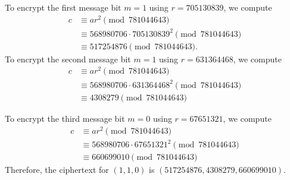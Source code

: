 \documentclass[
  coursecode={MTHE 418},
  assignmentname={Homework \homeworknumber},
  studentnumber=20053722,
  name={Bryan Hoang},
  draft,
]{
  ltxanswer%
}
\begin{document}
\begin{questions}
\begin{parts}
      \part{}
      \begin{solution}
        To encrypt the first message bit \(m = 1\) using \(r = 705130839\), we compute
        \begin{align*}
          c &\equiv ar^{2} \pmod{781044643}                        \\
            &\equiv 568980706 \cdot 705130839^{2} \pmod{781044643} \\
            &\equiv 517254876 \pmod{781044643}.
        \end{align*}
        To encrypt the second message bit \(m = 1\) using \(r = 631364468\), we compute
        \begin{align*}
          c &\equiv ar^{2} \pmod{781044643}                        \\
            &\equiv 568980706 \cdot 631364468^{2} \pmod{781044643} \\
            &\equiv 4308279 \pmod{781044643}
        \end{align*}

        To encrypt the third message bit \(m = 0\) using \(r = 67651321\), we compute
        \begin{align*}
          c &\equiv ar^{2} \pmod{781044643}                       \\
            &\equiv 568980706 \cdot 67651321^{2} \pmod{781044643} \\
            &\equiv 660699010 \pmod{781044643}
        \end{align*}
        Therefore, the ciphertext for \((1, 1, 0)\) is \(\boxed{(517254876, 4308279, 660699010)}\).
      \end{solution}
    \end{parts}
  \end{questions}
\end{document}
